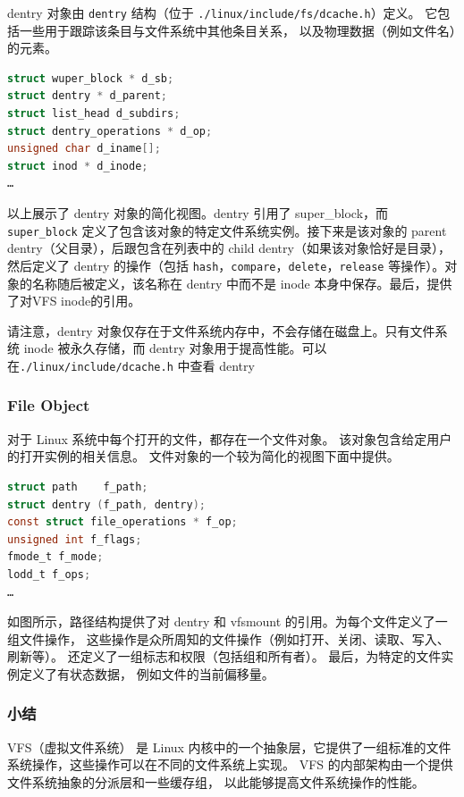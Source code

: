 \documentclass[UTF8,a4paper]{ctexart}
\begin{document}
dentry 对象由 \texttt{dentry} 结构（位于
\texttt{./linux/include/fs/dcache.h}）定义。
它包括一些用于跟踪该条目与文件系统中其他条目关系，
以及物理数据（例如文件名）的元素。

\begin{lstlisting}[language=C]
struct wuper_block * d_sb;
struct dentry * d_parent;
struct list_head d_subdirs;
struct dentry_operations * d_op;
unsigned char d_iname[];
struct inod * d_inode;
…
\end{lstlisting}

以上展示了 dentry 对象的简化视图。dentry 引用了 super\_block，而
\texttt{super\_block}
定义了包含该对象的特定文件系统实例。接下来是该对象的 parent
dentry（父目录），后跟包含在列表中的 child
dentry（如果该对象恰好是目录），然后定义了 dentry 的操作（包括
\texttt{hash}，\texttt{compare}，\texttt{delete}，\texttt{release}
等操作）。对象的名称随后被定义，该名称在 dentry 中而不是 inode
本身中保存。最后，提供了对VFS inode的引用。

请注意，dentry
对象仅存在于文件系统内存中，不会存储在磁盘上。只有文件系统 inode
被永久存储，而 dentry
对象用于提高性能。可以在\texttt{./linux/include/dcache.h} 中查看 dentry

\subsubsection*{File Object}

对于 Linux
系统中每个打开的文件，都存在一个文件对象。
该对象包含给定用户的打开实例的相关信息。
文件对象的一个较为简化的视图下面中提供。

\begin{lstlisting}[language=C]
struct path    f_path;
struct dentry (f_path, dentry);
const struct file_operations * f_op;
unsigned int f_flags;
fmode_t f_mode;
lodd_t f_ops;
…
\end{lstlisting}

如图所示，路径结构提供了对 dentry 和 vfsmount
的引用。为每个文件定义了一组文件操作，
这些操作是众所周知的文件操作（例如打开、关闭、读取、写入、刷新等）。
还定义了一组标志和权限（包括组和所有者）。
最后，为特定的文件实例定义了有状态数据，
例如文件的当前偏移量。
\subsubsection{小结}
VFS（虚拟文件系统）
是 Linux
内核中的一个抽象层，它提供了一组标准的文件系统操作，这些操作可以在不同的文件系统上实现。
VFS
的内部架构由一个提供文件系统抽象的分派层和一些缓存组，
以此能够提高文件系统操作的性能。
\end{document}
